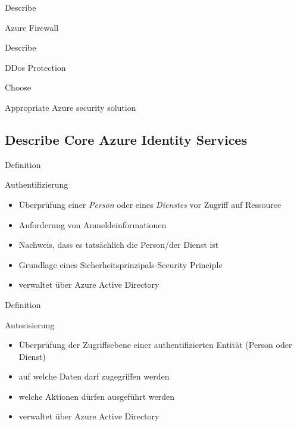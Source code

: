 \documentclass{scrartcl}
\newenvironment{flashcard}[2][]{%
    #1
    \vfill
    \centerline{\Large{#2}}
    \vfill
    \newpage
}
{\newpage}
\newcommand{\subsectioncard}[1]{
    \vspace*{\stretch{1}}
    \subsection{#1}
    \vspace*{\stretch{1}}
    \pagebreak
}
\begin{document}
    \begin{flashcard}[Describe]{Azure Firewall}

    \end{flashcard}

    \begin{flashcard}[Describe]{DDos Protection}

    \end{flashcard}

    \begin{flashcard}[Choose]{Appropriate Azure security solution}

    \end{flashcard}

    \subsectioncard{Describe Core Azure Identity Services}

    \begin{flashcard}[Definition]{Authentifizierung}
        \begin{itemize}
            \item Überprüfung einer \emph{Person} oder eines \emph{Dienstes} vor Zugriff auf Ressource
            \item Anforderung von Anmeldeinformationen
            \item Nachweis, dass es tatsächlich die Person/der Dienst ist
            \item Grundlage eines Sicherheitsprinzipals-Security Principle
            \item verwaltet über Azure Active Directory
        \end{itemize}
    \end{flashcard}

    \begin{flashcard}[Definition]{Autorisierung}
        \begin{itemize}
            \item Überprüfung der Zugriffsebene einer authentifizierten Entität (Person oder Dienst)
            \item auf welche Daten darf zugegriffen werden
            \item welche Aktionen dürfen ausgeführt werden
            \item verwaltet über Azure Active Directory
        \end{itemize}
    \end{flashcard}
\end{document}
